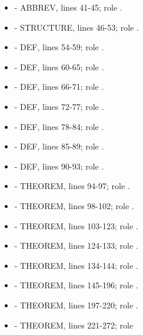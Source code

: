 \begin{itemize}
\tightlist
\item
  \texttt{\protect{}} - ABBREV, lines 41-45; role \texttt{\protect{}}.
\item
  \texttt{\protect{}} - STRUCTURE, lines 46-53; role \texttt{\protect{}}.
\item
  \texttt{\protect{}} - DEF, lines 54-59; role \texttt{\protect{}}.
\item
  \texttt{\protect{}} - DEF, lines 60-65; role \texttt{\protect{}}.
\item
  \texttt{\protect{}} - DEF, lines 66-71; role \texttt{\protect{}}.
\item
  \texttt{\protect{}} - DEF, lines 72-77; role \texttt{\protect{}}.
\item
  \texttt{\protect{}} - DEF, lines 78-84; role \texttt{\protect{}}.
\item
  \texttt{\protect{}} - DEF, lines 85-89; role \texttt{\protect{}}.
\item
  \texttt{\protect{}} - DEF, lines 90-93; role \texttt{\protect{}}.
\item
  \texttt{\protect{}} - THEOREM, lines 94-97; role \texttt{\protect{}}.
\item
  \texttt{\protect{}} - THEOREM, lines 98-102; role
  \texttt{\protect{}}.
\item
  \texttt{\protect{}} - THEOREM, lines 103-123; role
  \texttt{\protect{}}.
\item
  \texttt{\protect{}} - THEOREM, lines 124-133; role
  \texttt{\protect{}}.
\item
  \texttt{\protect{}} - THEOREM, lines 134-144; role
  \texttt{\protect{}}.
\item
  \texttt{\protect{}} - THEOREM, lines 145-196; role
  \texttt{\protect{}}.
\item
  \texttt{\protect{}} - THEOREM, lines 197-220; role
  \texttt{\protect{}}.
\item
  \texttt{\protect{}} - THEOREM, lines 221-272; role

\end{itemize}
